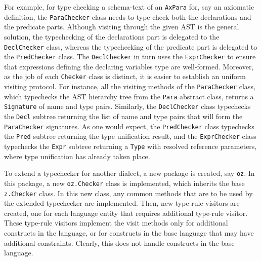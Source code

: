 \documentclass{llncs}
\begin{document}
For example, for type checking a schema-text of an {\tt AxPara} for, say an
axiomatic definition, the {\tt ParaChecker} class needs to type check both the
declarations and the predicate parts. Although visiting through the given AST is the
general solution, the typechecking of the declarations part is delegated to the {\tt DeclChecker} class,
whereas the typechecking of the predicate part is delegated to the {\tt PredChecker} class.
The {\tt DeclChecker} in turn uses the {\tt ExprChecker} to ensure that expressions defining the
declaring variables type are well-formed.
Moreover, as the job of each {\tt Checker} class is distinct, it is easier to establish an
uniform visiting protocol. For instance, all the visiting methods of the {\tt ParaChecker} class,
which typechecks the AST hierarchy tree from the {\tt Para} abstract class, returns a {\tt Signature}
of name and type pairs. Similarly, the {\tt DeclChecker} class typechecks the {\tt Decl} subtree
returning the list of name and type pairs that will form the {\tt ParaChecker} signatures.
As one would expect, the {\tt PredChecker} class typechecks the {\tt Pred} subtree
returning the type unification result, and the {\tt ExprChecker} class typechecks the {\tt Expr} subtree
returning a {\tt Type} with resolved reference parameters, where type unification has already taken place.

To extend a typechecker for another dialect, a new package is created, say {\tt oz}.
In this package, a new {\tt oz.Checker} class is implemented, which
inherits the base {\tt z.Checker} class. In this new class, any common
methods that are to be used by the extended typechecker are implemented.
Then, new type-rule visitors are created, one for each language entity that
requires additional type-rule visitor.  These type-rule visitors
implement the visit methods only for additional constructs in the
language, or for constructs in the base language that may have
additional constraints. Clearly, this does not handle constructs in
the base language.
\end{document}
